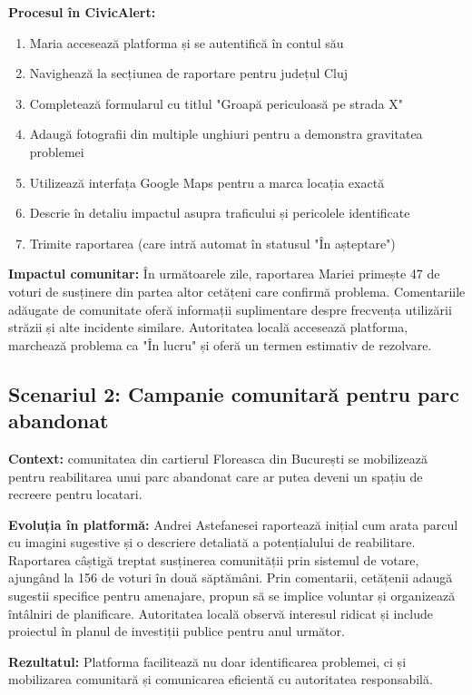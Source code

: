 \documentclass[12pt,a4paper]{report}
\begin{document}
\textbf{Procesul în CivicAlert:}
\begin{enumerate}
\item Maria accesează platforma și se autentifică în contul său
\item Navighează la secțiunea de raportare pentru județul Cluj
\item Completează formularul cu titlul "Groapă periculoasă pe strada X"
\item Adaugă fotografii din multiple unghiuri pentru a demonstra gravitatea problemei
\item Utilizează interfața Google Maps pentru a marca locația exactă
\item Descrie în detaliu impactul asupra traficului și pericolele identificate
\item Trimite raportarea (care intră automat în statusul "În așteptare")
\end{enumerate}

\textbf{Impactul comunitar:} În următoarele zile, raportarea Mariei primește 47 de voturi de susținere din partea altor cetățeni care confirmă problema. Comentariile adăugate de comunitate oferă informații suplimentare despre frecvența utilizării străzii și alte incidente similare. Autoritatea locală accesează platforma, marchează problema ca "În lucru" și oferă un termen estimativ de rezolvare.

\subsection{Scenariul 2: Campanie comunitară pentru parc abandonat}

\textbf{Context:} comunitatea din cartierul Floreasca din București se mobilizează pentru reabilitarea unui parc abandonat care ar putea deveni un spațiu de recreere pentru locatari.

\textbf{Evoluția în platformă:}
Andrei Astefanesei raportează inițial cum arata  parcul cu imagini sugestive și o descriere detaliată a potențialului de reabilitare. Raportarea câștigă treptat susținerea comunității prin sistemul de votare, ajungând la 156 de voturi în două săptămâni. Prin comentarii, cetățenii adaugă sugestii specifice pentru amenajare, propun să se implice voluntar și organizează întâlniri de planificare. Autoritatea locală observă interesul ridicat și include proiectul în planul de investiții publice pentru anul următor.

\textbf{Rezultatul:} Platforma facilitează nu doar identificarea problemei, ci și mobilizarea comunitară și comunicarea eficientă cu autoritatea responsabilă.
\end{document}
